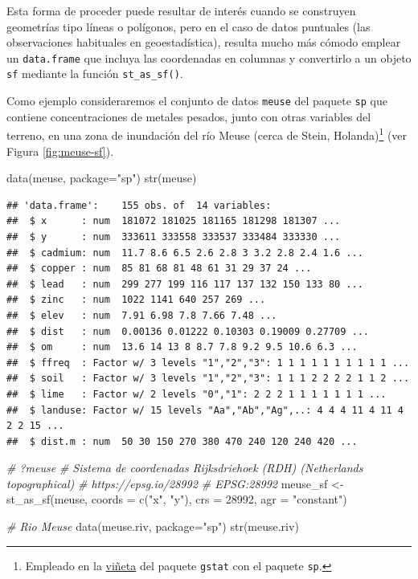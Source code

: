 \documentclass[
  spanish,
]{book}
\newenvironment{Shaded}{\begin{snugshade}}{\end{snugshade}}
\newcommand{\AttributeTok}[1]{\textcolor[rgb]{0.77,0.63,0.00}{#1}}
\newcommand{\CommentTok}[1]{\textcolor[rgb]{0.56,0.35,0.01}{\textit{#1}}}
\newcommand{\DecValTok}[1]{\textcolor[rgb]{0.00,0.00,0.81}{#1}}
\newcommand{\FunctionTok}[1]{\textcolor[rgb]{0.00,0.00,0.00}{#1}}
\newcommand{\NormalTok}[1]{#1}
\newcommand{\OtherTok}[1]{\textcolor[rgb]{0.56,0.35,0.01}{#1}}
\newcommand{\StringTok}[1]{\textcolor[rgb]{0.31,0.60,0.02}{#1}}
\theoremstyle{break}
\begin{document}
Esta forma de proceder puede resultar de interés cuando se construyen geometrías tipo líneas o polígonos, pero en el caso de datos puntuales (las observaciones habituales en geoestadística), resulta mucho más cómodo emplear un \texttt{data.frame} que incluya las coordenadas en columnas y convertirlo a un objeto \texttt{sf} mediante la función \texttt{st\_as\_sf()}.

Como ejemplo consideraremos el conjunto de datos \texttt{meuse} del paquete \texttt{sp} que contiene concentraciones de metales pesados, junto con otras variables del terreno, en una zona de inundación del río Meuse (cerca de Stein, Holanda)\footnote{Empleado en la \href{https://cran.r-project.org/web/packages/gstat/vignettes/gstat.pdf}{viñeta} del paquete \texttt{gstat} con el paquete \texttt{sp}.} (ver Figura \ref{fig:meuse-sf}).

\begin{Shaded}
\begin{Highlighting}[]
\FunctionTok{data}\NormalTok{(meuse, }\AttributeTok{package=}\StringTok{"sp"}\NormalTok{)}
\FunctionTok{str}\NormalTok{(meuse)}
\end{Highlighting}
\end{Shaded}

\begin{verbatim}
## 'data.frame':    155 obs. of  14 variables:
##  $ x      : num  181072 181025 181165 181298 181307 ...
##  $ y      : num  333611 333558 333537 333484 333330 ...
##  $ cadmium: num  11.7 8.6 6.5 2.6 2.8 3 3.2 2.8 2.4 1.6 ...
##  $ copper : num  85 81 68 81 48 61 31 29 37 24 ...
##  $ lead   : num  299 277 199 116 117 137 132 150 133 80 ...
##  $ zinc   : num  1022 1141 640 257 269 ...
##  $ elev   : num  7.91 6.98 7.8 7.66 7.48 ...
##  $ dist   : num  0.00136 0.01222 0.10303 0.19009 0.27709 ...
##  $ om     : num  13.6 14 13 8 8.7 7.8 9.2 9.5 10.6 6.3 ...
##  $ ffreq  : Factor w/ 3 levels "1","2","3": 1 1 1 1 1 1 1 1 1 1 ...
##  $ soil   : Factor w/ 3 levels "1","2","3": 1 1 1 2 2 2 2 1 1 2 ...
##  $ lime   : Factor w/ 2 levels "0","1": 2 2 2 1 1 1 1 1 1 1 ...
##  $ landuse: Factor w/ 15 levels "Aa","Ab","Ag",..: 4 4 4 11 4 11 4 2 2 15 ...
##  $ dist.m : num  50 30 150 270 380 470 240 120 240 420 ...
\end{verbatim}

\begin{Shaded}
\begin{Highlighting}[]
\CommentTok{\# ?meuse }
\CommentTok{\# Sistema de coordenadas Rijksdriehoek (RDH) (Netherlands topographical) }
\CommentTok{\# https://epsg.io/28992 \# EPSG:28992}
\NormalTok{meuse\_sf }\OtherTok{\textless{}{-}} \FunctionTok{st\_as\_sf}\NormalTok{(meuse, }\AttributeTok{coords =} \FunctionTok{c}\NormalTok{(}\StringTok{"x"}\NormalTok{, }\StringTok{"y"}\NormalTok{), }\AttributeTok{crs =} \DecValTok{28992}\NormalTok{, }\AttributeTok{agr =} \StringTok{"constant"}\NormalTok{)}

\CommentTok{\# Rio Meuse }
\FunctionTok{data}\NormalTok{(meuse.riv, }\AttributeTok{package=}\StringTok{"sp"}\NormalTok{)}
\FunctionTok{str}\NormalTok{(meuse.riv)}
\end{Highlighting}
\end{Shaded}
\end{document}

